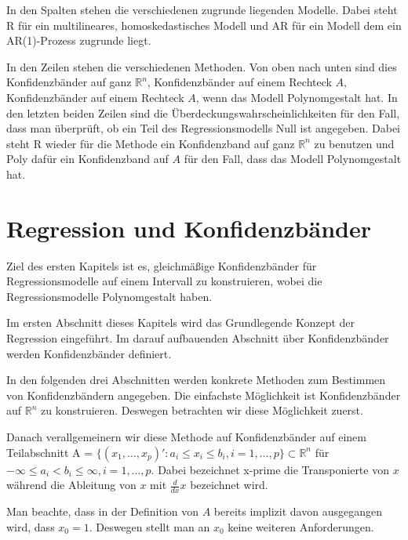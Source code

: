 \documentclass[12pt,a4paper]{article}
\theoremstyle{definition}
\theoremstyle{definition}
\theoremstyle{definition}
\begin{document}
In den Spalten stehen die verschiedenen zugrunde liegenden Modelle. Dabei steht R für ein multilineares, homoskedastisches Modell und AR für ein Modell dem ein AR(1)-Prozess zugrunde liegt.

In den Zeilen stehen die verschiedenen Methoden. Von oben nach unten sind dies Konfidenzbänder auf ganz $\mathbb{R}^n$, Konfidenzbänder auf einem Rechteck $A$, Konfidenzbänder auf einem Rechteck $A$, wenn das Modell Polynomgestalt hat. In den letzten beiden Zeilen sind die Überdeckungswahrscheinlichkeiten für den Fall, dass man überprüft, ob ein Teil des Regressionsmodells Null ist angegeben. Dabei steht R wieder für die Methode ein Konfidenzband auf ganz $\mathbb{R}^n$ zu benutzen und Poly dafür ein Konfidenzband auf $A$ für den Fall, dass das Modell Polynomgestalt hat.


\newpage
\printglossary[title=Variablenverzeichnis]



\newpage
\section{Regression und Konfidenzbänder}
\label{Regression und Konfidenzbaender}
Ziel des ersten Kapitels ist es, gleichmäßige Konfidenzbänder für Regressionsmodelle auf einem Intervall zu konstruieren, wobei die Regressionsmodelle Polynomgestalt haben. 

Im ersten Abschnitt dieses Kapitels wird das Grundlegende Konzept der Regression eingeführt. Im darauf aufbauenden Abschnitt über Konfidenzbänder werden Konfidenzbänder definiert. 

In den folgenden drei Abschnitten werden konkrete Methoden zum Bestimmen von Konfidenzbändern angegeben. 
Die einfachste Möglichkeit ist Konfidenzbänder auf $\mathbb{R}^n$ zu konstruieren. Deswegen betrachten wir diese Möglichkeit zuerst.

Danach verallgemeinern wir diese Methode auf Konfidenzbänder auf einem Teilabschnitt \gls{A} = $\{(x_1, \ldots, x_p)' : a_i \leq x_i \leq b_i, i = 1, \ldots, p \} \subset \mathbb{R}^n$ für $- \infty \leq a_i < b_i \leq \infty, i=1, \ldots, p$. Dabei bezeichnet \gls{x-prime} die Transponierte von $x$ während die Ableitung von $x$ mit $\frac{d}{dx}x$ bezeichnet wird. 

Man beachte, dass in der Definition von $A$ bereits implizit davon ausgegangen wird, dass $x_0=1$. Deswegen stellt man an $x_0$ keine weiteren Anforderungen.
\end{document}
